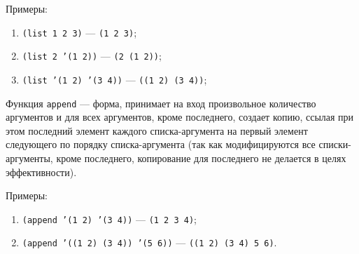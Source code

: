 Примеры:
\begin{enumerate}
    \item \texttt{(list 1 2 3)} --- \texttt{(1 2 3)};
    \item \texttt{(list 2 '(1 2))} --- \texttt{(2 (1 2))};
    \item \texttt{(list '(1 2) '(3 4))} --- \texttt{((1 2) (3 4))};
\end{enumerate}

Функция \texttt{append} --- форма, принимает на вход произвольное количество аргументов и для всех аргументов, кроме последнего, создает копию, ссылая при этом последний элемент каждого списка-аргумента на первый элемент следующего по порядку списка-аргумента (так как модифицируются все списки-аргументы, кроме последнего, копирование для последнего не делается в целях эффективности).

Примеры:
\begin{enumerate}
    \item \texttt{(append '(1 2) '(3 4))} --- \texttt{(1 2 3 4)};
    \item \texttt{(append '((1 2) (3 4)) '(5 6))} --- \texttt{((1 2) (3 4) 5 6)}.
\end{enumerate}
